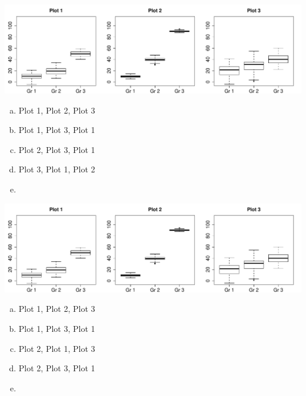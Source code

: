 \documentclass[11pt,containsverbatim,handout]{beamer}
\begin{document}
\begin{frame}


\begin{center}
\includegraphics[width=\textwidth]{figures/within_between/within_between}
\end{center}

\begin{multicols}{2}
\begin{enumerate}[(a)]
\item Plot 1, Plot 2, Plot 3
\item Plot 1, Plot 3, Plot 1
\item Plot 2, Plot 3, Plot 1
\item Plot 3, Plot 1, Plot 2
\item[]
\end{enumerate}
\end{multicols}

\end{frame}


\begin{frame}


\begin{center}
\includegraphics[width=\textwidth]{figures/within_between/within_between}
\end{center}

\begin{multicols}{2}
\begin{enumerate}[(a)]
\item Plot 1, Plot 2, Plot 3
\item Plot 1, Plot 3, Plot 1
\item Plot 2, Plot 1, Plot 3
\item Plot 2, Plot 3, Plot 1
\item[]
\end{enumerate}
\end{multicols}

\end{frame}
\end{document}

